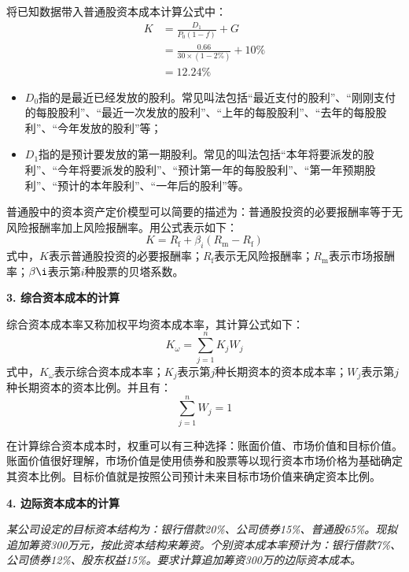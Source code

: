 \documentclass[
  10pt,
  twoside,
  openany,
  b5paper, %
  colorscheme = black, %
  xits = false,
]{qyxf-book}
\begin{document}
将已知数据带入普通股资本成本计算公式中：
\begin{equation*}
	\begin{aligned}
		K &= \frac{D_1}{P_0(1-f)} +G \\[1.5ex] &= \frac{0.66}{30 \times (1-2\%)} + 10\% \\[1.5ex]
		&= 12.24\%
	\end{aligned}
\end{equation*}
\begin{note}
	\begin{itemize}
		\item $D_0$指的是最近已经发放的股利。常见叫法包括“最近支付的股利”、“刚刚支付的每股股利”、“最近一次发放的股利”、“上年的每股股利”、“去年的每股股利”、“今年发放的股利”等；
		\item $D_1$指的是预计要发放的第一期股利。常见的叫法包括“本年将要派发的股利”、“今年将要派发的股利”、“预计第一年的每股股利”、“第一年预期股利”、“预计的本年股利”、“一年后的股利”等。
	\end{itemize}

\end{note}
普通股中的资本资产定价模型可以简要的描述为：普通股投资的必要报酬率等于无风险报酬率加上风险报酬率。用公式表示如下：
\begin{equation*}
	K = R_\mathrm{f} + \beta_i(R_\mathrm{m} - R_\mathrm{f})
\end{equation*}
式中，$K$表示普通股投资的必要报酬率；$R_\mathrm{f}$表示无风险报酬率；$R_\mathrm{m}$表示市场报酬率；$\beta\i$表示第$i$种股票的贝塔系数。

\newpage

\textbf{3. 综合资本成本的计算}

综合资本成本率又称加权平均资本成本率，其计算公式如下：
\begin{equation*}
	K_\omega = \sum_{j=1}^{n} K_jW_j
\end{equation*}
式中，$K_\omega$表示综合资本成本率；$K_j$表示第$j$种长期资本的资本成本率；$W_j$表示第$j$种长期资本的资本比例。并且有：
\begin{equation*}
	\sum_{j=1}^{n} W_j =1
\end{equation*}

在计算综合资本成本时，权重可以有三种选择：账面价值、市场价值和目标价值。账面价值很好理解，市场价值是使用债券和股票等以现行资本市场价格为基础确定其资本比例。目标价值就是按照公司预计未来目标市场价值来确定资本比例。

\textbf{4. 边际资本成本的计算}

\emph{某公司设定的目标资本结构为：银行借款20\%、公司债券15\%、普通股65\%。现拟追加筹资300万元，按此资本结构来筹资。个别资本成本率预计为：银行借款7\%、公司债券12\%、股东权益15\%。要求计算追加筹资300万的边际资本成本。 }
\end{document}
